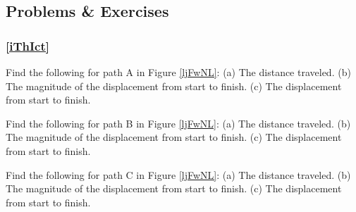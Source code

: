 \documentclass[../../main-ap-physics.tex]{subfiles}
\begin{document}

\clearpage

\printnoidxglossaries

\clearpage

\subsection{Problems \& Exercises}

\subsubsection*{\ref{iThIct} }

\begin{center}
\captionsetup{type=figure,margin=1in,font=scriptsize}
\label{ljFwNL}
\end{center}

\begin{exercise}
    Find the following for path A in Figure \ref{ljFwNL}: (a) The distance traveled. (b) The magnitude of the displacement from start to finish. (c) The displacement from start to finish.
\end{exercise}

\begin{exercise}
    Find the following for path B in Figure \ref{ljFwNL}: (a) The distance traveled. (b) The magnitude of the displacement from start to finish. (c) The displacement from start to finish.
\end{exercise}

\begin{exercise}
    Find the following for path C in Figure \ref{ljFwNL}: (a) The distance traveled. (b) The magnitude of the displacement from start to finish. (c) The displacement from start to finish.
\end{exercise}
\end{document}
